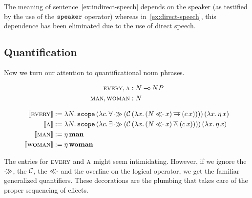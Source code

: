\documentclass{llncs}
\newcommand{\negSpaceBeforeAlign}{\vspace{-4mm}}
\newcommand{\negSpaceBetweenAlign}{\vspace{-8mm}}
\begin{document}
The meaning of sentence~\eqref{ex:indirect-speech} depends on the speaker
(as testified by the use of the $\mathtt{speaker}$ operator) whereas
in~\eqref{ex:direct-speech}, this dependence has been eliminated due to the
use of direct speech.

\subsection{Quantification}
\label{ssec:quantification}

Now we turn our attention to quantificational noun phrases.

\negSpaceBeforeAlign

\begin{align*}
  \textsc{every}, \textsc{a} &: N \mathbin{{-}\mkern-3.5mu{\circ}} NP \\
  \textsc{man}, \textsc{woman} &: N
\end{align*}

\negSpaceBetweenAlign

\begin{align*}
  \lex{every}{\lam{N}{\app{\op{scope}}{(\lam{c}{\forall \apr
          (\ap{\CC}{(\lam{x}{(N \apl x) \dimpl (\ap{c}{x})})})})}{(\lam{x}{\etaE{x}})}}} \\
  \lex{a}{\lam{N}{\app{\op{scope}}{(\lam{c}{\exists \apr
          (\ap{\CC}{(\lam{x}{(N \apl x) \dand (\ap{c}{x})})})})}{(\lam{x}{\etaE{x}})}}} \\
  \lex{man}{\etaE{\obj{man}}} \\
  \lex{woman}{\etaE{\obj{woman}}}
\end{align*}

The entries for $\textsc{every}$ and $\textsc{a}$ might seem
intimidating. However, if we ignore the $\mathbin{\cdot\!\!\gg}$, the $\mathcal{C}$, the $\mathbin{\ll\!\!\cdot}$ and
the overline on the logical operator, we get the familiar generalized
quantifiers. These decorations are the plumbing that takes care of the
proper sequencing of effects.
\end{document}
